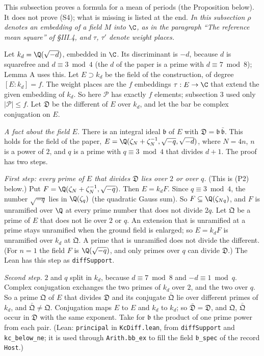 \documentclass[11pt,letterpaper]{article}
\begin{document}
This subsection proves a formula for a mean of periods (the Proposition below). It does not prove (S4);
what is missing is listed at the end. \emph{In this subsection $\rho$ denotes an embedding of a field $M$
into $\C$, as in the paragraph ``The reference mean square'' of \S III.4, and $\tau$, $\tau'$ denote
weight places.}

Let $k_d=\Q(\sqrt{-d})$, embedded in $\C$. Its discriminant is $-d$, because $d$ is squarefree and
$d\equiv3\bmod4$ (the $d$ of the paper is a prime with $d\equiv7\bmod8$); Lemma A uses this. Let
$E\supset k_d$ be the field of the construction, of degree $[E:k_d]=f$. The weight places are the $f$
embeddings $\tau:E\to\C$ that extend the given embedding of $k_d$. So here $\mathcal P$ has exactly $f$
elements; subsection 3 used only $|\mathcal P|\le f$. Let $\mathfrak D$ be the different of $E$ over
$k_d$, and let the bar be complex conjugation on $E$.

\emph{A fact about the field $E$.} There is an integral ideal $\mathfrak b$ of $E$ with
$\mathfrak D=\mathfrak b\,\bar{\mathfrak b}$. This holds for the field of the paper,
$E=\Q(\zeta_N+\zeta_N^{-1},\sqrt{-q},\sqrt{-d})$, where $N=4n$, $n$ is a power of $2$, and $q$ is a prime
with $q\equiv3\bmod4$ that divides $d+1$. The proof has two steps.

\emph{First step: every prime of $E$ that divides $\mathfrak D$ lies over $2$ or over $q$.} (This is
(P2) below.) Put $F=\Q(\zeta_N+\zeta_N^{-1},\sqrt{-q})$. Then $E=k_dF$. Since $q\equiv3\bmod4$, the number
$\sqrt{-q}$ lies in $\Q(\zeta_q)$ (the quadratic Gauss sum). So $F\subseteq\Q(\zeta_{Nq})$, and $F$ is
unramified over $\Q$ at every prime number that does not divide $2q$. Let $\mathfrak Q$ be a prime of $E$
that does not lie over $2$ or $q$. An extension that is unramified at a prime stays unramified when the
ground field is enlarged; so $E=k_dF$ is unramified over $k_d$ at $\mathfrak Q$. A prime that is
unramified does not divide the different. (For $n=1$ the field $F$ is $\Q(\sqrt{-q})$, and only primes
over $q$ can divide $\mathfrak D$.) The Lean has this step as \texttt{diffSupport}.

\emph{Second step.} $2$ and $q$ split in $k_d$, because $d\equiv7\bmod8$ and $-d\equiv1\bmod q$. Complex
conjugation exchanges the two primes of $k_d$ over $2$, and the two over $q$. So a prime $\mathfrak Q$ of
$E$ that divides $\mathfrak D$ and its conjugate $\bar{\mathfrak Q}$ lie over different primes of $k_d$,
and $\bar{\mathfrak Q}\ne\mathfrak Q$. Conjugation maps $E$ to $E$ and $k_d$ to $k_d$; so
$\bar{\mathfrak D}=\mathfrak D$, and $\mathfrak Q$, $\bar{\mathfrak Q}$ occur in $\mathfrak D$ with the
same exponent. Take for $\mathfrak b$ the product of one prime power from each pair. (Lean:
\texttt{principal} in \texttt{KcDiff.lean}, from \texttt{diffSupport} and \texttt{kc\_below\_ne}; it is
used through \texttt{Arith.bb\_ex} to fill the field $\mathfrak b$\texttt{\_spec} of the record
\texttt{Host}.)
\end{document}
